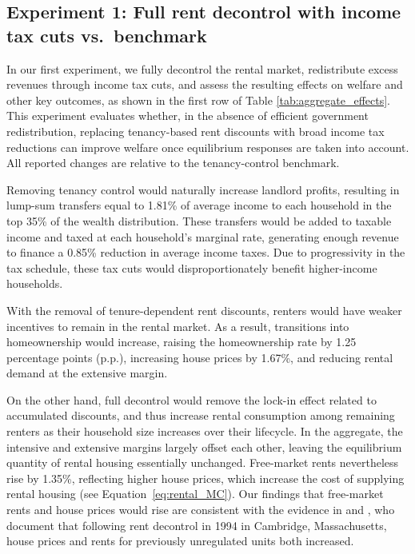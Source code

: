 \documentclass[parskip=full]{article}
\begin{document}
\subsection{Experiment 1: Full rent decontrol with income tax cuts vs.\ benchmark}\label{sec:exp_1}

In our first experiment, we fully decontrol the rental market, redistribute excess revenues through income tax cuts, and assess the resulting effects on welfare and other key outcomes, as shown in the first row of Table \ref{tab:aggregate_effects}. This experiment evaluates whether, in the absence of efficient government redistribution, replacing tenancy-based rent discounts with broad income tax reductions can improve welfare once equilibrium responses are taken into account. All reported changes are relative to the tenancy-control benchmark.

Removing tenancy control would naturally increase landlord profits, resulting in lump-sum transfers equal to 1.81\% of average income to each household in the top 35\% of the wealth distribution. These transfers would be added to taxable income and taxed at each household’s marginal rate, generating enough revenue to finance a 0.85\% reduction in average income taxes. Due to progressivity in the tax schedule, these tax cuts would disproportionately benefit higher-income households.

With the removal of tenure-dependent rent discounts, renters would have weaker incentives to remain in the rental market. As a result, transitions into homeownership would increase, raising the homeownership rate by 1.25 percentage points (p.p.), increasing house prices by 1.67\%, and reducing rental demand at the extensive margin. 

On the other hand, full decontrol would remove the lock-in effect related to accumulated discounts, and thus increase rental consumption among remaining renters as their household size increases over their lifecycle. In the aggregate, the intensive and extensive margins largely offset each other, leaving the equilibrium quantity of rental housing essentially unchanged. Free-market rents nevertheless rise by 1.35\%, reflecting higher house prices, which increase the cost of supplying rental housing (see Equation~\eqref{eq:rental_MC}). Our findings that free-market rents and house prices would rise are consistent with the evidence in \citet{sims-2007} and \citet{app-2014}, who document that following rent decontrol in 1994 in Cambridge, Massachusetts, house prices and rents for previously unregulated units both increased.
\end{document}
